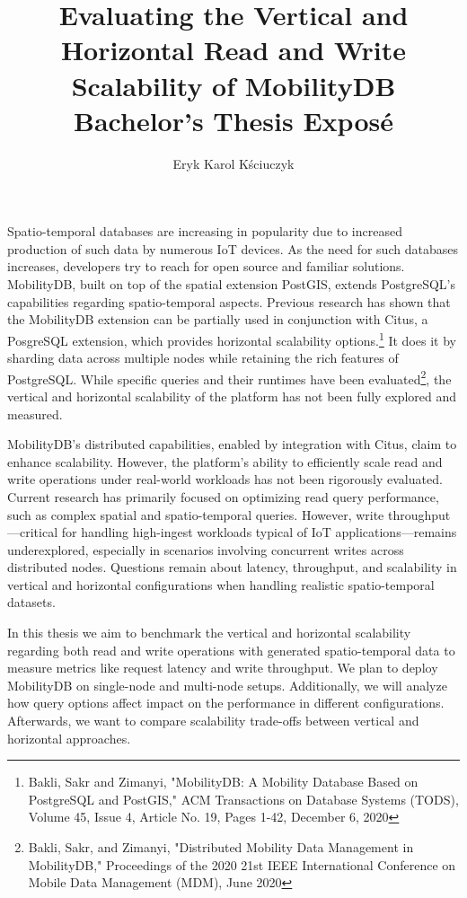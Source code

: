 \documentclass{article}
\title{Evaluating the Vertical and Horizontal Read and Write Scalability of MobilityDB \\[1ex] \large Bachelor's Thesis Exposé}
\author{Eryk Karol Kściuczyk}
\date{} %
\begin{document}
\maketitle


Spatio-temporal databases are increasing in popularity due to increased production of such data by numerous IoT devices.
As the need for such databases increases, developers try to reach for open source and familiar solutions.
MobilityDB, built on top of the spatial extension PostGIS, extends PostgreSQL's capabilities regarding spatio-temporal aspects.
Previous research has shown that the MobilityDB extension can be partially used in conjunction with Citus,
a PosgreSQL extension, which provides horizontal scalability
options.\footnote{
Bakli, Sakr and Zimanyi, "MobilityDB: A Mobility Database Based on PostgreSQL and PostGIS," ACM Transactions on Database Systems (TODS), Volume 45, Issue 4, Article No. 19, Pages 1-42, December 6, 2020
} It does it by sharding data across multiple nodes while retaining the rich features of PostgreSQL.
While specific queries and their runtimes have been evaluated\footnote{
Bakli, Sakr, and Zimanyi, "Distributed Mobility Data Management in MobilityDB," Proceedings of the 2020 21st IEEE International Conference on Mobile Data Management (MDM), June 2020
}, the vertical and horizontal scalability of the platform has not been fully explored and measured.

MobilityDB's distributed capabilities, enabled by integration with Citus, claim to enhance scalability.
However, the platform's ability to efficiently scale read and write operations under real-world workloads has not been rigorously evaluated.
Current research has primarily focused on optimizing read query performance,
such as complex spatial and spatio-temporal queries. However, write throughput—critical for handling high-ingest
workloads typical of IoT applications—remains underexplored, especially in scenarios involving concurrent writes
across distributed nodes.
Questions remain about latency, throughput, and scalability in vertical and horizontal configurations when handling realistic spatio-temporal datasets.

In this thesis we aim to benchmark the vertical and horizontal scalability regarding both read and write
operations with generated spatio-temporal data to measure metrics like request latency and write throughput.
We plan to deploy MobilityDB on single-node and multi-node setups.
Additionally, we will analyze how query options affect impact on the performance in different configurations.
Afterwards, we want to compare scalability trade-offs between vertical and horizontal approaches.
\end{document}
